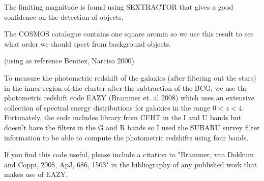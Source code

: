 The limiting magnitude is found using SEXTRACTOR that gives a good confidence on the detection of objects.

The COSMOS catalogue contains one square arcmin so we use this result to see what order  we should spect from background objects.

(using as reference Benitez, Narciso 2000)

To measure the photometric redshift of the galaxies (after filtering out the stars) in the inner region of the cluster after the subtraction of the BCG, we use the photometric redshift code EAZY (Brammer et. al 2008) which uses an extensive collection of spectral energy distributions for galaxies in the range $0<z<4$. Fortunately, the code includes library from CFHT in the I and U bands but doesn't have the filters in the G and R bands so I used the SUBARU survey filter information to be able to compute the photometric redshifts using four bands.

If you find this code useful, please include a citation to "Brammer, van Dokkum and Coppi, 2008, ApJ, 686, 1503" in the bibliography of any published work that makes use of EAZY.